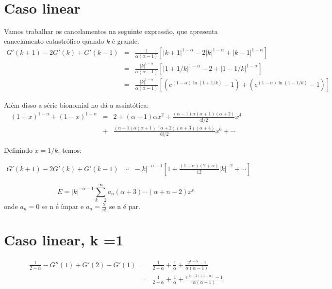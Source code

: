 \documentclass[10pt,a4paper]{article}%
\begin{document}
\section{Caso linear}
Vamos trabalhar os cancelamentos na seguinte expressão, que apresenta cancelamento catastrófico quando $k$ é grande.
\begin{eqnarray*}
    G'(k+1) - 2G'(k) + G'(k-1) &=&\frac{1}{\alpha(\alpha-1)}\left[|k+1|^{1-\alpha}-2|k|^{1-\alpha} + |k-1|^{1-\alpha}\right] \\
    &=&\frac{|k|^{1-\alpha}}{\alpha(\alpha-1)}\left[|1+1/k|^{1-\alpha}-2 + |1-1/k|^{1-\alpha}\right]\\
    &=&\frac{|k|^{1-\alpha}}{\alpha(\alpha-1)}\left[\left(e^{(1-\alpha)\ln(1+1/k)}-1\right) + \left(e^{(1-\alpha)\ln(1-1/k)}-1\right)\right]
\end{eqnarray*}

Além disso a série bionomial no dá a assintótica:
\begin{eqnarray*}
    (1+x)^{1-\alpha} + (1-x)^{1-\alpha} &=& 2 + (\alpha - 1) \alpha x^2 + \frac{(\alpha - 1) \alpha (\alpha + 1) (\alpha + 2)}{4!/2} x^4\\ &+& \frac{(\alpha - 1) \alpha (\alpha + 1) (\alpha + 2) (\alpha + 3) (\alpha + 4)}{6!/2} x^6 +\cdots
\end{eqnarray*}

Definindo $x=1/k$, temos:

\begin{eqnarray*}
    G'(k+1) - 2G'(k) + G'(k-1) &\sim& -|k|^{-\alpha-1}\left[1 + \frac{(1+\alpha)(2+\alpha)}{12}|k|^{-2}+ \cdots \right]
\end{eqnarray*}

$$E = |k|^{-\alpha-1}\sum_{k=2}^\infty a_n (\alpha+ 3)\cdots (\alpha + n -2)x^n$$ 
onde $a_n = 0$ se n é ímpar e $a_n = \frac{2}{n!}$ se n é par.

\section{Caso linear, k =1}
\begin{eqnarray*}
    \frac{1}{2-\alpha}-G''(1) + G'(2) - G'(1) &=&\frac{1}{2-\alpha}+\frac{1}{\alpha} + \frac{2^{1-\alpha}-1}{\alpha(\alpha-1)}\\
    &=&\frac{1}{2-\alpha}+\frac{1}{\alpha} + \frac{e^{\ln(2)(1-\alpha)}-1}{\alpha(\alpha-1)}\\
\end{eqnarray*}


\newpage
\end{document}
